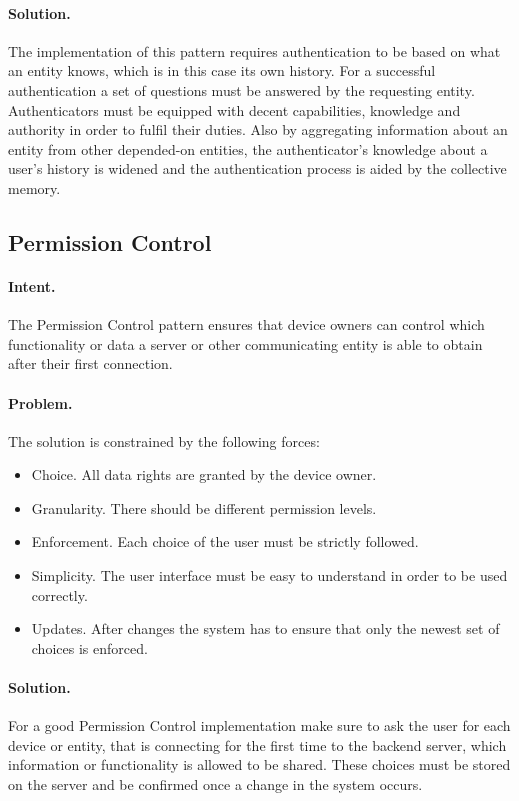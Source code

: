 \paragraph{\textbf{Solution.}} The implementation of this pattern requires authentication to be based on what an entity knows, which is in this case its own history. For a successful authentication a set of questions must be answered by the requesting entity. Authenticators must be equipped with decent capabilities, knowledge and authority in order to fulfil their duties. Also by aggregating information about an entity from other depended-on entities, the authenticator's knowledge about a user's history is widened and the authentication process is aided by the collective memory. 


\subsection{Permission Control~\cite{Reinfurt20172}} 
\label{p:control}

\paragraph{\textbf{Intent.}} The Permission Control pattern ensures that device owners can control which functionality or data a server or other communicating entity is able to obtain after their first connection. 

\paragraph{\textbf{Problem.}} The solution is constrained by the following forces:
\begin{itemize}
	\item Choice. All data rights are granted by the device owner. 
	\item Granularity. There should be different permission levels.
	\item Enforcement. Each choice of the user must be strictly followed.
	\item Simplicity. The user interface must be easy to understand in order to be used correctly.
	\item Updates. After changes the system has to ensure that only the newest set of choices is enforced.
\end{itemize}

\paragraph{\textbf{Solution.}} For a good Permission Control implementation make sure to ask the user for each device or entity, that is connecting for the first time to the backend server, which information or functionality is allowed to be shared. These choices must be stored on the server and be confirmed once a change in the system occurs.


